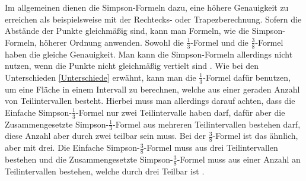 Im allgemeinen dienen die Simpson-Formeln dazu, eine höhere Genauigkeit zu erreichen als beispielsweise mit der Rechtecks- oder Trapezberechnung. \textsc{\cite[S. 310]{NumMathe}} Sofern die Abstände der Punkte gleichmäßig sind, kann man Formeln, wie die Simpson-Formeln, höherer Ordnung anwenden. Sowohl die \(\frac{1}{3}\)-Formel und die \(\frac{3}{8}\)-Formel haben die gleiche Genauigkeit. Man kann die Simpson-Formeln allerdings nicht nutzen, wenn die Punkte nicht gleichmäßig vertielt sind \textsc{\cite[S. 186]{NumMethodsScienceEng}}. Wie bei den Unterschieden \ref{Unterschiede} erwähnt, kann man die \(\frac{1}{3}\)-Formel dafür benutzen, um eine Fläche in einem Intervall zu berechnen, welche aus einer geraden Anzahl von Teilintervallen besteht. Hierbei muss man allerdings darauf achten, dass die Einfache Simpson-\(\frac{1}{3}\)-Formel nur zwei Teilintervalle haben darf, dafür aber die Zusammengesetzte Simpson-\(\frac{1}{3}\)-Formel aus mehreren Teilintervallen bestehen darf, diese Anzahl aber durch zwei teilbar sein muss. Bei der \(\frac{3}{8}\)-Formel ist das ähnlich, aber mit drei. Die Einfache Simpson-\(\frac{3}{8}\)-Formel muss aus drei Teilintervallen bestehen und die Zusammengesetzte Simpson-\(\frac{3}{8}\)-Formel muss aus einer Anzahl an Teilintervallen bestehen, welche durch drei Teilbar ist \textsc{\cite[S. 180]{NumMethodsScienceEng}} \textsc{\cite[S. 186]{NumMethodsScienceEng}}. 








